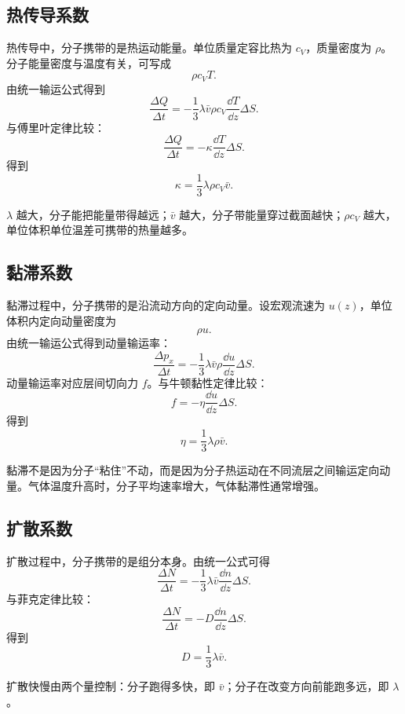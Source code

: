 \subsection{热传导系数}

热传导中，分子携带的是热运动能量。单位质量定容比热为 \(c_V\)，质量密度为 \(\rho\)。分子能量密度与温度有关，可写成
\[
  \rho c_VT.
\]
由统一输运公式得到
\[
  \frac{\Delta Q}{\Delta t}
  =
  -\frac13\lambda\bar v\rho c_V
  \frac{\dd T}{\dd z}\Delta S.
\]
与傅里叶定律比较：
\[
  \frac{\Delta Q}{\Delta t}
  =
  -\kappa\frac{\dd T}{\dd z}\Delta S.
\]
得到
\[
  \boxed{
  \kappa=\frac13\lambda\rho c_V\bar v
  }.
\]

\begin{KeyBox}[热传导系数的含义]
\(\lambda\) 越大，分子能把能量带得越远；\(\bar v\) 越大，分子带能量穿过截面越快；\(\rho c_V\) 越大，单位体积单位温差可携带的热量越多。
\end{KeyBox}

\subsection{黏滞系数}

黏滞过程中，分子携带的是沿流动方向的定向动量。设宏观流速为 \(u(z)\)，单位体积内定向动量密度为
\[
  \rho u.
\]
由统一输运公式得到动量输运率：
\[
  \frac{\Delta p_x}{\Delta t}
  =
  -\frac13\lambda\bar v\rho
  \frac{\dd u}{\dd z}\Delta S.
\]
动量输运率对应层间切向力 \(f\)。与牛顿黏性定律比较：
\[
  f
  =
  -\eta\frac{\dd u}{\dd z}\Delta S.
\]
得到
\[
  \boxed{
  \eta=\frac13\lambda\rho\bar v
  }.
\]

\begin{KeyBox}[黏滞系数的含义]
黏滞不是因为分子“粘住”不动，而是因为分子热运动在不同流层之间输运定向动量。气体温度升高时，分子平均速率增大，气体黏滞性通常增强。
\end{KeyBox}

\subsection{扩散系数}

扩散过程中，分子携带的是组分本身。由统一公式可得
\[
  \frac{\Delta N}{\Delta t}
  =
  -\frac13\lambda\bar v
  \frac{\dd n}{\dd z}\Delta S.
\]
与菲克定律比较：
\[
  \frac{\Delta N}{\Delta t}
  =
  -D\frac{\dd n}{\dd z}\Delta S.
\]
得到
\[
  \boxed{
  D=\frac13\lambda\bar v
  }.
\]

\begin{KeyBox}[扩散系数的含义]
扩散快慢由两个量控制：分子跑得多快，即 \(\bar v\)；分子在改变方向前能跑多远，即 \(\lambda\)。
\end{KeyBox}

